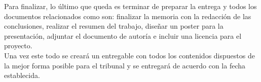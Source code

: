 Para finalizar, lo último que queda es terminar de preparar la entrega y todos los documentos relacionados
como son: finalizar la memoria con la redacción de las conclusiones, realizar el resumen del trabajo, 
diseñar un poster para la presentación, adjuntar el documento de autoría e incluir una licencia para el
proyecto. \\ 
Una vez este todo se creará un entregable con todos los contenidos dispuestos de la mejor forma posible
para el tribunal y se entregará de acuerdo con la fecha establecida.